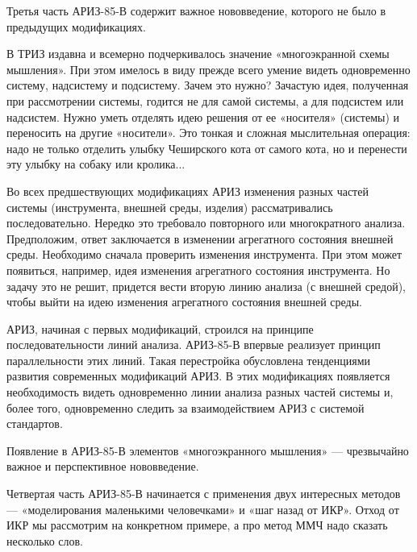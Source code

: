 Третья часть АРИЗ-85-В содержит  важное нововведение, которого не было
в предыдущих модификациях.

В ТРИЗ издавна и всемерно подчеркивалось значение «многоэкранной схемы
мышления».  При  этом  имелось  в  виду  прежде  всего  умение  видеть
одновременно  систему,  надсистему  и  подсистему.  Зачем  это  нужно?
Зачастую  идея, полученная  при рассмотрении  системы, годится  не для
самой системы,  а для  подсистем или  надсистем. Нужно  уметь отделять
идею  решения  от  ее  «носителя» (системы)  и  переносить  на  другие
«носители». Это тонкая и сложная мыслительная операция: надо не только
отделить улыбку  Чеширского кота  от самого кота,  но и  перенести эту
улыбку на собаку или кролика...

Во  всех  предшествующих  модификациях АРИЗ  изменения  разных  частей
системы   (инструмента,   внешней  среды,   изделия)   рассматривались
последовательно.  Нередко это  требовало повторного  или многократного
анализа.  Предположим,  ответ   заключается  в  изменении  агрегатного
состояния  внешней  среды.   Необходимо  сначала  проверить  изменения
инструмента.  При  этом  может  появиться,  например,  идея  изменения
агрегатного состояния  инструмента. Но  задачу это не  решит, придется
вести вторую  линию анализа  (с внешней средой),  чтобы выйти  на идею
изменения агрегатного состояния внешней среды.

АРИЗ,   начиная   с   первых   модификаций,   строился   на   принципе
последовательности линий анализа.  АРИЗ-85-В впервые реализует принцип
параллельности этих  линий. Такая перестройка  обусловлена тенденциями
развития современных модификаций АРИЗ.  В этих модификациях появляется
необходимость видеть одновременно линии  анализа разных частей системы
и, более того, одновременно следить за взаимодействием АРИЗ с системой
стандартов.

Появление   в   АРИЗ-85-В   элементов  «многоэкранного   мышления»   —
чрезвычайно важное и перспективное нововведение.

Четвертая  часть АРИЗ-85-В  начинается  с  применения двух  интересных
методов — «моделирования маленькими человечками» и «шаг назад от ИКР».
Отход от ИКР мы рассмотрим на конкретном примере, а про метод ММЧ надо
сказать несколько слов.


